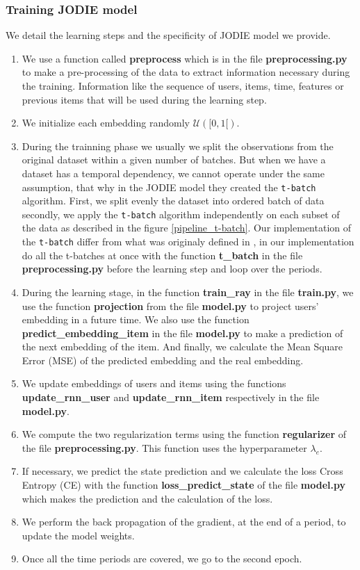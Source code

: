 \subsubsection{Training JODIE model} 


We detail the learning steps and the specificity of JODIE model we provide. 
\begin{enumerate}
    \item We use a function called \textbf{preprocess} which is in the file \textbf{preprocessing.py} to make a pre-processing of the data to extract information necessary during the training. Information like the sequence of users, items, time, features or previous items that will be used during the learning step.
    \item We initialize each embedding randomly $\mathcal{U}([0,1[)$.
    \item During the trainning phase we usually we split the observations from the original dataset within a given number of batches. But when we have a dataset has a temporal dependency, we cannot operate under the same assumption, that why in the JODIE model they created the \texttt{t-batch} algorithm. First, we split evenly the dataset into ordered batch of data secondly, we apply the \texttt{t-batch} algorithm independently on each subset of the data as described in the figure \ref{pipeline_t-batch}. Our implementation of the \texttt{t-batch} differ from what was originaly defined in \cite{kumar18}, in our implementation do all the t-batches at once with the function \textbf{t\_batch} in the file \textbf{preprocessing.py} before the learning step and loop over the periods.
    \item During the learning stage, in the function \textbf{train\_ray} in the file \textbf{train.py}, we use the function \textbf{projection} from the file \textbf{model.py} to project users' embedding in a future time. We also use the function \textbf{predict\_embedding\_item} in the file \textbf{model.py} to make a prediction of the next embedding of the item. And finally, we calculate the Mean Square Error (MSE) of the predicted embedding and the real embedding.
    \item We update embeddings of users and items using the functions \textbf{update\_rnn\_user} and \textbf{update\_rnn\_item} respectively in the file \textbf{model.py}.
    \item We compute the two regularization terms using the function \textbf{regularizer} of the file \textbf{preprocessing.py}. This function uses the hyperparameter $\lambda_e$.
    \item If necessary, we predict the state prediction and we calculate the loss Cross Entropy (CE) with the function \textbf{loss\_predict\_state} of the file \textbf{model.py} which makes the prediction and the calculation of the loss.
    \item We perform the back propagation of the gradient, at the end of a period, to update the model weights.
    \item Once all the time periods are covered, we go to the second epoch.
\end{enumerate}
